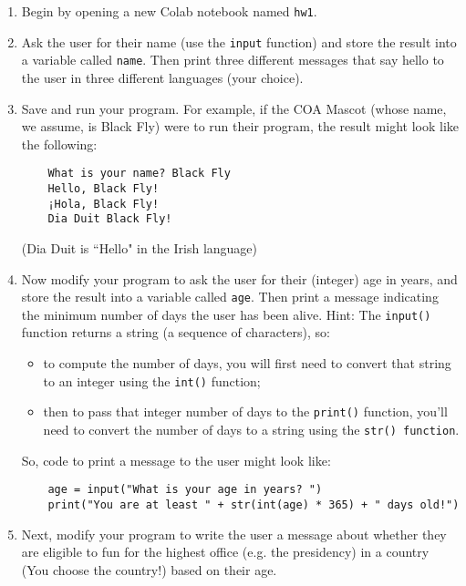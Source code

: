 \documentclass[10pt]{article}
\begin{document}
  \begin{enumerate}
    \item Begin by opening a new Colab notebook named {\tt hw1}.
    \item Ask the user for their name (use the {\tt input} function) and store
    the result into a variable called {\tt name}.
    Then print three different messages that say hello to the user in three
    different languages (your choice).
    \item Save and run your program.  For example, if the COA Mascot (whose
    name, we assume, is Black Fly) were to run their program, the result might
    look like the following:
\begin{verbatim}
    What is your name? Black Fly
    Hello, Black Fly!
    ¡Hola, Black Fly!
    Dia Duit Black Fly!
\end{verbatim}
(Dia Duit is ``Hello" in the Irish language)
    \item Now modify your program to ask the user for their (integer) age in
    years, and store the result into a variable called {\tt age}. 
    Then print a message indicating the minimum number of days the user has
    been alive.
    \vspace*{10pt} Hint: The {\tt input()} function returns a string (a
        sequence of characters), so:
        \begin{itemize}
            \item to compute the number of days, you will first need to convert that string to an integer using the {\tt int()} function;
            \item then to pass that integer number of days to the {\tt print()}
                function, you'll need to convert the number of days to a string
                using the {\tt str() function}.
        \end{itemize}
        So, code to print a message to the user might look like:
\begin{verbatim}
    age = input("What is your age in years? ")
    print("You are at least " + str(int(age) * 365) + " days old!")
\end{verbatim}


    \item Next, modify your program to write the user a message about whether they are eligible to fun for the highest office (e.g. the presidency) in a country (You choose the country!) based on their age. 


\end{enumerate}
\end{document}
